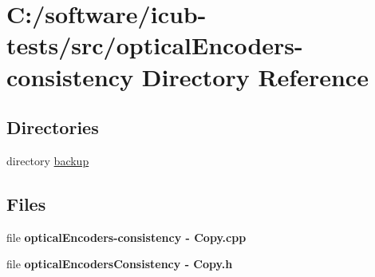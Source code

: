 \section{C\+:/software/icub-\/tests/src/optical\+Encoders-\/consistency Directory Reference}
\label{dir_0aefa438636c1636d118e887341170fd}
\subsection*{Directories}
\begin{DoxyCompactItemize}
\item 
directory \hyperlink{dir_bbdfa1361df38a3ac69e875a79726829}{backup}
\end{DoxyCompactItemize}
\subsection*{Files}
\begin{DoxyCompactItemize}
\item 
file {\bfseries optical\+Encoders-\/consistency -\/ Copy.\+cpp}
\item 
file {\bfseries optical\+Encoders\+Consistency -\/ Copy.\+h}
\end{DoxyCompactItemize}
